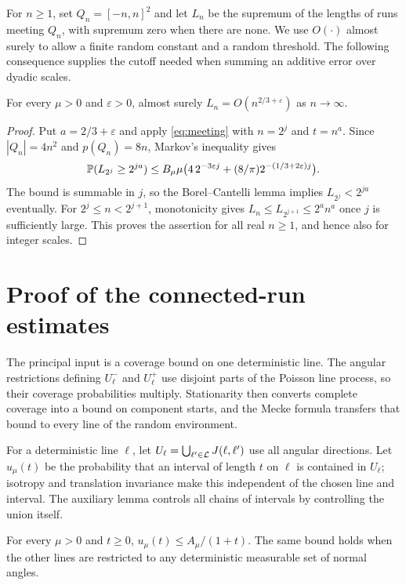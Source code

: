 \documentclass[11pt,letterpaper]{article}
\begin{document}
For $n\ge1$, set $Q_n=[-n,n]^2$ and let $L_n$ be the supremum of the lengths of runs meeting $Q_n$, with supremum zero when there are none. We use $O(\cdot)$ almost surely to allow a finite random constant and a random threshold. The following consequence supplies the cutoff needed when summing an additive error over dyadic scales.

\begin{corollary}\label{cor:maximum}
For every $\mu>0$ and $\varepsilon>0$, almost surely $L_n=O(n^{2/3+\varepsilon})$ as $n\to\infty$.
\end{corollary}

\begin{proof}
Put $a=2/3+\varepsilon$ and apply \eqref{eq:meeting} with $n=2^j$ and $t=n^a$. Since $|Q_n|=4n^2$ and $p(Q_n)=8n$, Markov's inequality gives
\[
 \P(L_{2^j}\ge2^{ja})
 \le B_\mu\mu\big(4\,2^{-3\varepsilon j}
                +(8/\pi)2^{-(1/3+2\varepsilon)j}\big).
\]
The bound is summable in $j$, so the Borel--Cantelli lemma implies $L_{2^j}<2^{ja}$ eventually. For $2^j\le n<2^{j+1}$, monotonicity gives $L_n\le L_{2^{j+1}}\le2^a n^a$ once $j$ is sufficiently large. This proves the assertion for all real $n\ge1$, and hence also for integer scales.
\end{proof}

\section{Proof of the connected-run estimates}

The principal input is a coverage bound on one deterministic line. The angular restrictions defining $U_\ell^-$ and $U_\ell^+$ use disjoint parts of the Poisson line process, so their coverage probabilities multiply. Stationarity then converts complete coverage into a bound on component starts, and the Mecke formula transfers that bound to every line of the random environment.

For a deterministic line $\ell$, let $U_\ell=\bigcup_{\ell'\in\cL}J(\ell,\ell')$ use all angular directions. Let $u_\mu(t)$ be the probability that an interval of length $t$ on $\ell$ is contained in $U_\ell$; isotropy and translation invariance make this independent of the chosen line and interval. The auxiliary lemma controls all chains of intervals by controlling the union itself.

\begin{lemma}\label{lem:coverage}
For every $\mu>0$ and $t\ge0$, $u_\mu(t)\le A_\mu/(1+t)$. The same bound holds when the other lines are restricted to any deterministic measurable set of normal angles.
\end{lemma}
\end{document}
